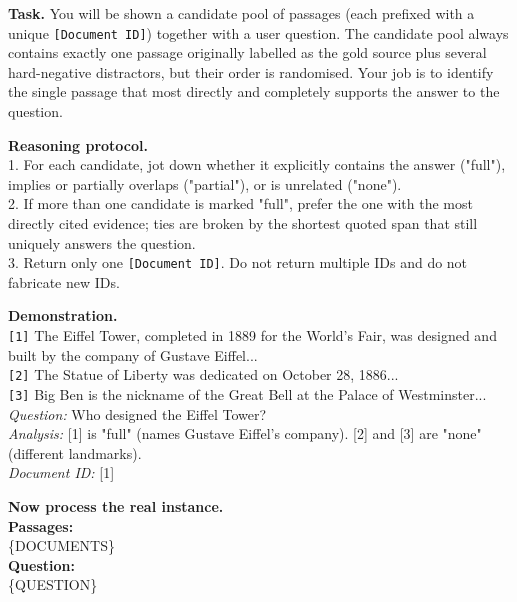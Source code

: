 
\begin{tcolorbox}[
    enhanced,
    colback=white,
    colframe=black,
    arc=5mm,
    boxrule=1pt,
    left=2mm,
    right=2mm,
    top=1mm,
    bottom=1mm
]

\textbf{Task.} You will be shown a candidate pool of passages (each prefixed with a unique \texttt{[Document ID]}) together with a user question. The candidate pool always contains exactly one passage originally labelled as the gold source plus several hard-negative distractors, but their order is randomised. Your job is to identify the single passage that most directly and completely supports the answer to the question.

\textbf{Reasoning protocol.}\\
1. For each candidate, jot down whether it explicitly contains the answer ("full"), implies or partially overlaps ("partial"), or is unrelated ("none").\\
2. If more than one candidate is marked "full", prefer the one with the most directly cited evidence; ties are broken by the shortest quoted span that still uniquely answers the question.\\
3. Return only one \texttt{[Document ID]}. Do not return multiple IDs and do not fabricate new IDs.

\textbf{Demonstration.}\\
\texttt{[1]} The Eiffel Tower, completed in 1889 for the World's Fair, was designed and built by the company of Gustave Eiffel... \\
\texttt{[2]} The Statue of Liberty was dedicated on October 28, 1886...\\
\texttt{[3]} Big Ben is the nickname of the Great Bell at the Palace of Westminster...\\

\emph{Question:} Who designed the Eiffel Tower?\\
\emph{Analysis:} [1] is "full" (names Gustave Eiffel's company). [2] and [3] are "none" (different landmarks).\\
\emph{Document ID:} [1]

\textbf{Now process the real instance.}\\

\textbf{Passages:}\\
\{DOCUMENTS\}\\

\textbf{Question:}\\
\{QUESTION\}\\

\end{tcolorbox}
